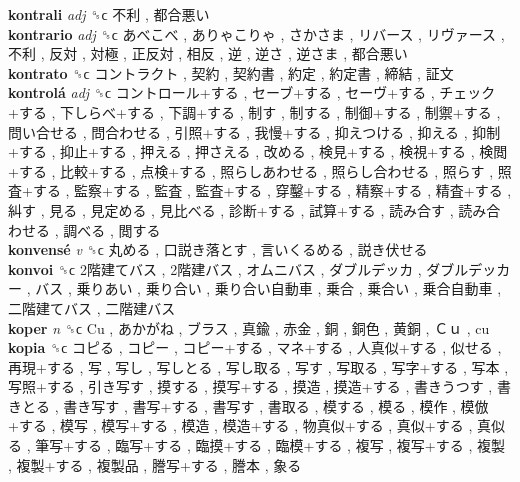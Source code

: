 \textbf{kontrali} \emph{adj}  ␝ϲ   不利 ,  都合悪い   \\
\textbf{kontrario} \emph{adj}  ␝ϲ   あべこべ ,  ありゃこりゃ ,  さかさま ,  リバース ,  リヴァース ,  不利 ,  反対 ,  対極 ,  正反対 ,  相反 ,  逆 ,  逆さ ,  逆さま ,  都合悪い   \\
\textbf{kontrato} ␝ϲ   コントラクト ,  契約 ,  契約書 ,  約定 ,  約定書 ,  締結 ,  証文   \\
\textbf{kontrolá} \emph{adj}  ␝ϲ   コントロール+する ,  セーブ+する ,  セーヴ+する ,  チェック+する ,  下しらべ+する ,  下調+する ,  制す ,  制する ,  制御+する ,  制禦+する ,  問い合せる ,  問合わせる ,  引照+する ,  我慢+する ,  抑えつける ,  抑える ,  抑制+する ,  抑止+する ,  押える ,  押さえる ,  改める ,  検見+する ,  検視+する ,  検閲+する ,  比較+する ,  点検+する ,  照らしあわせる ,  照らし合わせる ,  照らす ,  照査+する ,  監察+する ,  監査 ,  監査+する ,  穿鑿+する ,  精察+する ,  精査+する ,  糾す ,  見る ,  見定める ,  見比べる ,  診断+する ,  試算+する ,  読み合す ,  読み合わせる ,  調べる ,  閲する   \\
\textbf{konvensé} \emph{v}  ␝ϲ   丸める ,  口説き落とす ,  言いくるめる ,  説き伏せる   \\
\textbf{konvoi} ␝ϲ   2階建てバス ,  2階建バス ,  オムニバス ,  ダブルデッカ ,  ダブルデッカー ,  バス ,  乗りあい ,  乗り合い ,  乗り合い自動車 ,  乗合 ,  乗合い ,  乗合自動車 ,  二階建てバス ,  二階建バス   \\
\textbf{koper} \emph{n}  ␝ϲ   Cu ,  あかがね ,  ブラス ,  真鍮 ,  赤金 ,  銅 ,  銅色 ,  黄銅 ,  Ｃｕ , cu  \\
\textbf{kopia} ␝ϲ   コピる ,  コピー ,  コピー+する ,  マネ+する ,  人真似+する ,  似せる ,  再現+する ,  写 ,  写し ,  写しとる ,  写し取る ,  写す ,  写取る ,  写字+する ,  写本 ,  写照+する ,  引き写す ,  摸する ,  摸写+する ,  摸造 ,  摸造+する ,  書きうつす ,  書きとる ,  書き写す ,  書写+する ,  書写す ,  書取る ,  模する ,  模る ,  模作 ,  模倣+する ,  模写 ,  模写+する ,  模造 ,  模造+する ,  物真似+する ,  真似+する ,  真似る ,  筆写+する ,  臨写+する ,  臨摸+する ,  臨模+する ,  複写 ,  複写+する ,  複製 ,  複製+する ,  複製品 ,  謄写+する ,  謄本 ,  象る   \\
